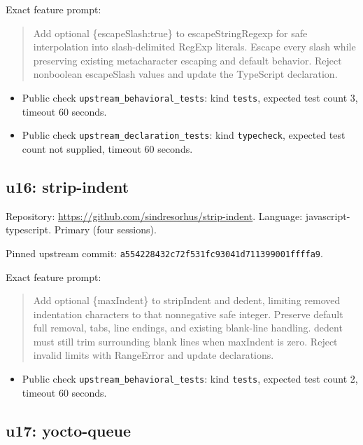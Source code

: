 \documentclass[manuscript,screen,nonacm]{acmart}
\providecommand{\tightlist}{\setlength{\itemsep}{0pt}\setlength{\parskip}{0pt}}
\begin{document}
Exact feature prompt:

\begin{quote}
Add optional \{escapeSlash:true\} to escapeStringRegexp for safe
interpolation into slash-delimited RegExp literals. Escape every slash
while preserving existing metacharacter escaping and default behavior.
Reject nonboolean escapeSlash values and update the TypeScript
declaration.
\end{quote}

\begin{itemize}
\tightlist
\item
  Public check \nolinkurl{upstream_behavioral_tests}: kind
  \texttt{tests}, expected test count 3, timeout 60 seconds.
\item
  Public check \nolinkurl{upstream_declaration_tests}: kind
  \texttt{typecheck}, expected test count not supplied, timeout 60
  seconds.
\end{itemize}

\subsection{u16: strip-indent}\label{u16-strip-indent}

Repository: \url{https://github.com/sindresorhus/strip-indent}.
Language: javascript-typescript. Primary (four sessions).

Pinned upstream commit:
\nolinkurl{a554228432c72f531fc93041d711399001ffffa9}.

Exact feature prompt:

\begin{quote}
Add optional \{maxIndent\} to stripIndent and dedent, limiting removed
indentation characters to that nonnegative safe integer. Preserve
default full removal, tabs, line endings, and existing blank-line
handling. dedent must still trim surrounding blank lines when maxIndent
is zero. Reject invalid limits with RangeError and update declarations.
\end{quote}

\begin{itemize}
\tightlist
\item
  Public check \nolinkurl{upstream_behavioral_tests}: kind
  \texttt{tests}, expected test count 2, timeout 60 seconds.
\end{itemize}

\subsection{u17: yocto-queue}\label{u17-yocto-queue}
\end{document}

